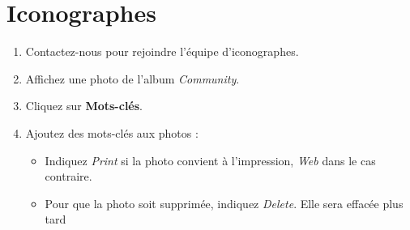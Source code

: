 \documentclass[12pt,nofoldmark,notumble]{leaflet}
\begin{document}



\clearpage

\section{\faTag Iconographes}

\vspace*{\fill}

\begin{enumerate}[itemsep=0mm,leftmargin=*]

\item Contactez-nous pour rejoindre l'équipe d'iconographes.
\item Affichez une photo de l'album \emph{Community}.
\item Cliquez sur \faPencil \textbf{Mots-clés}.
\item Ajoutez des mots-clés aux photos :

  \begin{itemize}
  \item Indiquez \emph{Print} si la photo convient à l'impression, \emph{Web}
    dans le cas contraire.

  \item Pour que la photo soit supprimée, indiquez \emph{Delete}.  Elle sera
    effacée plus tard

  \end{itemize}
\end{enumerate}
  
\begin{center}
  \setlength{\fboxsep}{0pt}%
  \setlength{\fboxrule}{0pt}%
\end{center}
\end{document}
